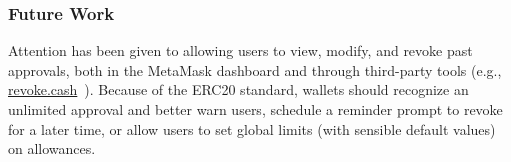 \documentclass[conference]{IEEEtran}
\begin{document}



\subsubsection*{\textbf{Future Work}}
Attention has been given to allowing users to view, modify, and revoke past approvals, both in the MetaMask dashboard and through third-party tools (e.g., \url{revoke.cash}~\cite{revokeCash}). Because of the ERC20 standard, wallets should recognize an unlimited approval and better warn users, schedule a reminder prompt to revoke for a later time, or allow users to set global limits (with sensible default values) on allowances.
\end{document}
